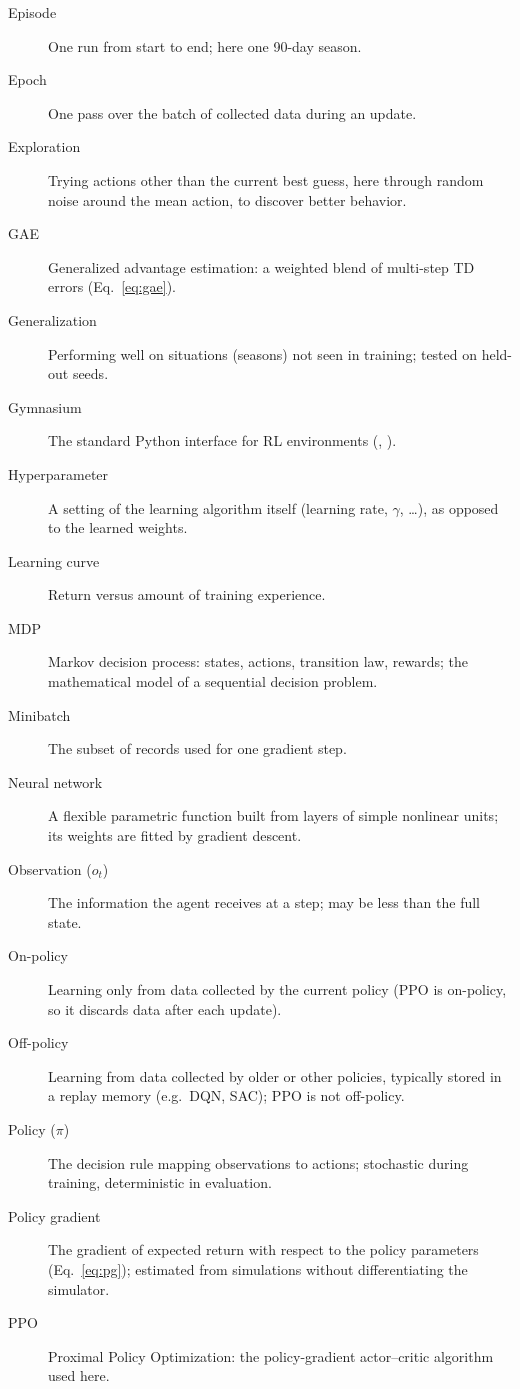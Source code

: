 \begin{description}
\item[Episode] One run from start to end; here one 90-day season.
\item[Epoch] One pass over the batch of collected data during an update.
\item[Exploration] Trying actions other than the current best guess, here through random noise around the mean action, to discover better behavior.
\item[GAE] Generalized advantage estimation: a weighted blend of multi-step TD errors (Eq.~\ref{eq:gae}).
\item[Generalization] Performing well on situations (seasons) not seen in training; tested on held-out seeds.
\item[Gymnasium] The standard Python interface for RL environments (, ).
\item[Hyperparameter] A setting of the learning algorithm itself (learning rate, $\gamma$, \dots), as opposed to the learned weights.
\item[Learning curve] Return versus amount of training experience.
\item[MDP] Markov decision process: states, actions, transition law, rewards; the mathematical model of a sequential decision problem.
\item[Minibatch] The subset of records used for one gradient step.
\item[Neural network] A flexible parametric function built from layers of simple nonlinear units; its weights are fitted by gradient descent.
\item[Observation ($o_t$)] The information the agent receives at a step; may be less than the full state.
\item[On-policy] Learning only from data collected by the current policy (PPO is on-policy, so it discards data after each update).
\item[Off-policy] Learning from data collected by older or other policies, typically stored in a replay memory (e.g.\ DQN, SAC); PPO is not off-policy.
\item[Policy ($\pi$)] The decision rule mapping observations to actions; stochastic during training, deterministic in evaluation.
\item[Policy gradient] The gradient of expected return with respect to the policy parameters (Eq.~\ref{eq:pg}); estimated from simulations without differentiating the simulator.
\item[PPO] Proximal Policy Optimization: the policy-gradient actor--critic algorithm used here.

\end{description}
